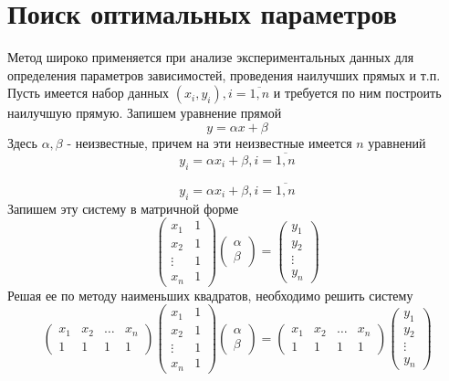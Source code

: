 \documentclass[professionalfonts,compress,unicode]{beamer}
\begin{document}
\section{Поиск оптимальных параметров}
{
	Метод широко применяется при анализе экспериментальных данных для определения параметров зависимостей, проведения наилучших прямых и т.п.
	Пусть имеется набор данных $(x_i, y_i), i=\overline{1,n}$ и требуется по ним построить наилучшую прямую. Запишем уравнение прямой 
	$$ y = \alpha x + \beta$$
	Здесь $\alpha, \beta$ - неизвестные, причем на эти неизвестные имеется $n$ уравнений
	$$ y_i = \alpha x_i + \beta, i = \overline{1,n}$$
}

{
	$$ y_i = \alpha x_i + \beta, i = \overline{1,n}$$
	Запишем эту систему в матричной форме
	$$
	\begin{pmatrix}
		x_1&1\\
		x_2&1\\
		\vdots&1\\
		x_n&1
	\end{pmatrix}
	\begin{pmatrix}
		\alpha\\\beta
	\end{pmatrix} = 
	\begin{pmatrix}
		y_1\\y_2\\\vdots\\y_n
	\end{pmatrix}
	$$
	Решая ее по методу наименьших квадратов, необходимо решить систему
	$$
	\begin{pmatrix}
		x_1&x_2&\dots&x_n\\
		1&1&1&1
	\end{pmatrix}	
	\begin{pmatrix}
		x_1&1\\
		x_2&1\\
		\vdots&1\\
		x_n&1
	\end{pmatrix}
	\begin{pmatrix}
		\alpha\\\beta
	\end{pmatrix} = 
	\begin{pmatrix}
		x_1&x_2&\dots&x_n\\
		1&1&1&1
	\end{pmatrix}		
	\begin{pmatrix}
		y_1\\y_2\\\vdots\\y_n
	\end{pmatrix}
	$$	
}
\end{document}

